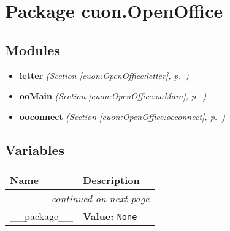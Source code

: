 %
%
%


\section{Package cuon.OpenOffice}

    \label{cuon:OpenOffice}


\subsection{Modules}

\begin{itemize}
\setlength{\parskip}{0ex}
\item \textbf{letter}
  \textit{(Section \ref{cuon:OpenOffice:letter}, p.~\pageref{cuon:OpenOffice:letter})}

\item \textbf{ooMain}
  \textit{(Section \ref{cuon:OpenOffice:ooMain}, p.~\pageref{cuon:OpenOffice:ooMain})}

\item \textbf{ooconnect}
  \textit{(Section \ref{cuon:OpenOffice:ooconnect}, p.~\pageref{cuon:OpenOffice:ooconnect})}

\end{itemize}



  \subsection{Variables}

    \vspace{-1cm}
\hspace{\varindent}\begin{longtable}{|p{\varnamewidth}|p{\vardescrwidth}|l}
\cline{1-2}
\cline{1-2} \centering \textbf{Name} & \centering \textbf{Description}& \\
\cline{1-2}
\endhead\cline{1-2}\multicolumn{3}{r}{\small\textit{continued on next page}}\\\endfoot\cline{1-2}
\endlastfoot\raggedright \_\-\_\-p\-a\-c\-k\-a\-g\-e\-\_\-\_\- & \raggedright \textbf{Value:} 
{\tt None}&\\
\cline{1-2}
\end{longtable}

